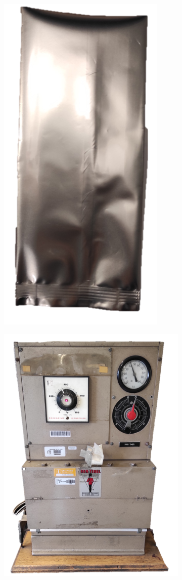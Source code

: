 \begin{refsection}
 \begin{figure}[h]
    \centering
    \begin{subfigure}[b]{0.3\linewidth}           \centering
        \includegraphics[width=0.5\linewidth]{Documento_Latex/Tesis 2/Imagenes/Non_Sealed_Bag.png}
        \caption{ }
        \label{fig:non_sealed_bag}
    \end{subfigure}
    \begin{subfigure}[b]{0.3\linewidth}
        \centering
        \includegraphics[width=0.8\linewidth]{Documento_Latex/Tesis 2/Imagenes/Sealer.png}

\end{subfigure}
\end{figure}
\end{refsection}
